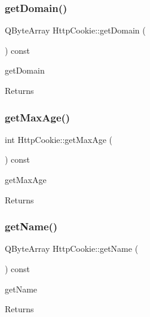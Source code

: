 \subsubsection{\texorpdfstring{get\+Domain()}{getDomain()}}
{\footnotesize\ttfamily Q\+Byte\+Array Http\+Cookie\+::get\+Domain (\begin{DoxyParamCaption}{ }\end{DoxyParamCaption}) const}



get\+Domain 

\begin{DoxyReturn}{Returns}

\end{DoxyReturn}
\mbox{\label{class_http_cookie_a3a55c75cb4220b303cbed4713f538995}} 
\subsubsection{\texorpdfstring{get\+Max\+Age()}{getMaxAge()}}
{\footnotesize\ttfamily int Http\+Cookie\+::get\+Max\+Age (\begin{DoxyParamCaption}{ }\end{DoxyParamCaption}) const}



get\+Max\+Age 

\begin{DoxyReturn}{Returns}

\end{DoxyReturn}
\mbox{\label{class_http_cookie_abecd0373e90e3701e82bb4dc630c54a7}} 
\subsubsection{\texorpdfstring{get\+Name()}{getName()}}
{\footnotesize\ttfamily Q\+Byte\+Array Http\+Cookie\+::get\+Name (\begin{DoxyParamCaption}{ }\end{DoxyParamCaption}) const}



get\+Name 

\begin{DoxyReturn}{Returns}

\end{DoxyReturn}
\mbox{\label{class_http_cookie_a3796862a6c50124eb5c987dd617a097c}} 
